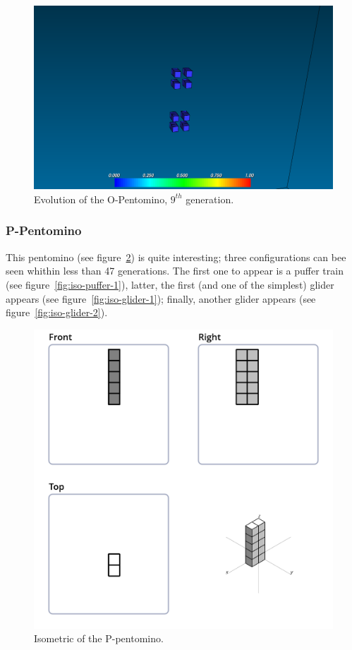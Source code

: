 \begin{figure}
	\centering
	\includegraphics[scale=0.3]{pentominoes_ss/o_osc.png}
	\caption{Evolution of the O-Pentomino, $9^{th}$ generation.}
  \label{fig:ss-pent:o-osc}
\end{figure}

\subsubsection{P-Pentomino}
\label{sec:p-pentomino}

This pentomino (see figure~\ref{fig:iso-pent-p}) is quite interesting; three
configurations can bee seen whithin less than 47 generations. The first one to
appear is a puffer train (see figure~\ref{fig:iso-puffer-1}), latter, the first
(and one of the simplest) glider appears (see figure~\ref{fig:iso-glider-1});
finally, another glider appears (see figure~\ref{fig:iso-glider-2}).

\begin{figure}
	\centering
	\includegraphics[scale=0.3]{iso_diagrams/o.png}
	\caption{Isometric of the P-pentomino.}
  \label{fig:iso-pent-p}
\end{figure}

